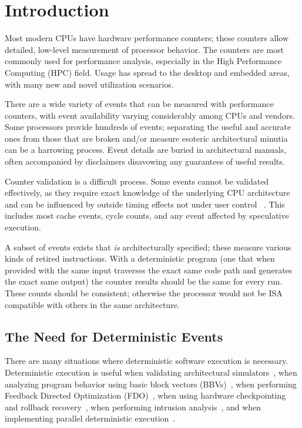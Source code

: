 \section{Introduction}

Most modern CPUs have hardware performance counters; these
counters allow detailed, low-level measurement of processor behavior.
The counters are most commonly used for performance analysis, especially
in the High Performance Computing (HPC) field.  Usage has spread
to the desktop and embedded areas, with many new and novel
utilization scenarios.

There are a wide variety of events that can be measured with performance
counters, with event availability varying considerably among CPUs and vendors.
Some processors provide hundreds of events; separating the
useful and accurate ones from those that are broken and/or measure
esoteric architectural minutia can be a harrowing process.
Event details are buried in architectural manuals, often accompanied
by disclaimers disavowing any guarantees of useful results.

Counter validation is a difficult process.  Some events cannot
be validated effectively, as they require exact knowledge of
the underlying CPU architecture and can be influenced
by outside timing effects not under user control
~\cite{mytkowicz+:asplos09}.
This includes most cache events, cycle counts, and any event
affected by speculative execution. 

A subset of events exists that {\em is} architecturally specified;
these measure various kinds of retired instructions.
With a deterministic program (one that when provided
with the same input traverses the exact same code path
and generates the exact same output)
the counter results should be the same for every run.
These counts should be consistent; otherwise
the processor would not be ISA compatible with others in
the same architecture.

\subsection{The Need for Deterministic Events}

There are many situations where deterministic software execution
is necessary.  
Deterministic execution is useful when validating 
architectural simulators~\cite{weaver+:wddd08,desikan+:trut01},
when analyzing program behavior using 
basic block vectors (BBVs)~\cite{weaver+:hipeac08},
when performing Feedback Directed Optimization (FDO)~\cite{chen+:cgo10},
when using hardware checkpointing and 
rollback recovery~\cite{stodden+:isas06}, 
when performing intrusion analysis~\cite{dunlap+:osdi02},
and when implementing parallel deterministic 
execution~\cite{rr:website}.

